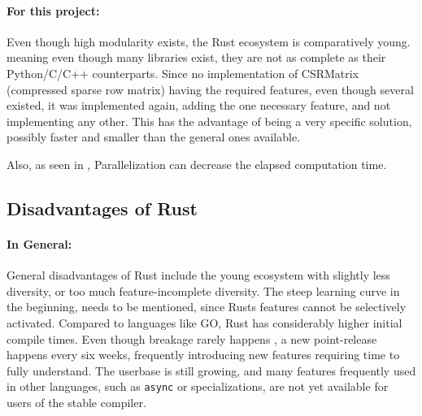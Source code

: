 \paragraph{For this project:} Even though high modularity exists, the Rust
ecosystem is comparatively young. meaning even though many libraries exist,
they are not as complete as their Python/C/C++ counterparts. Since no
implementation of CSRMatrix (compressed sparse row matrix) having the
required features, even though several existed, it was implemented again,
adding the one necessary feature, and not implementing any other. This has
the advantage of being a very specific solution, possibly faster and smaller
than the general ones available.

Also, as seen in , Parallelization can decrease
the elapsed computation time.








\subsection{Disadvantages of Rust}\label{sec:RustDisadvantages}


\paragraph{In General:} General disadvantages of Rust include the young ecosystem
with slightly less diversity, or too much feature-incomplete diversity. The
steep learning curve in the beginning, needs to be mentioned, since Rusts
features cannot be selectively activated. Compared to languages like GO, Rust
has considerably higher initial compile times. Even though breakage rarely
happens \cite{rustupdate}, a new point-release happens every six weeks,
frequently introducing new features requiring time to fully understand. The
userbase is still growing, and many features frequently used in other
languages, such as \verb|async| or specializations, are not yet available for
users of the stable compiler.

